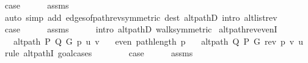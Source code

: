 \begin{isabellebody}
\ {\isacharquery}{\kern0pt}case\isanewline
\ \ \ \ \isamarkupfalse%
\ assms\isanewline
\ \ \ \ \isamarkupfalse%
\ {\isacharparenleft}{\kern0pt}auto\ simp\ add{\isacharcolon}{\kern0pt}\ edges{\isacharunderscore}{\kern0pt}of{\isacharunderscore}{\kern0pt}path{\isacharunderscore}{\kern0pt}rev{\isacharbrackleft}{\kern0pt}symmetric{\isacharbrackright}{\kern0pt}\ dest{\isacharcolon}{\kern0pt}\ alt{\isacharunderscore}{\kern0pt}pathD{\isacharparenleft}{\kern0pt}{}{\isacharparenright}{\kern0pt}\ intro{\isacharcolon}{\kern0pt}\ alt{\isacharunderscore}{\kern0pt}list{\isacharunderscore}{\kern0pt}rev{\isacharparenright}{\kern0pt}\isanewline
{}\isamarkupfalse%
\isanewline
\ \ \isamarkupfalse%
\ {}\isanewline
\ \ \isamarkupfalse%
\ {\isacharquery}{\kern0pt}case\isanewline
\ \ \ \ \isamarkupfalse%
\ assms{\isacharparenleft}{\kern0pt}{}{\isacharparenright}{\kern0pt}\isanewline
\ \ \ \ \isamarkupfalse%
\ {\isacharparenleft}{\kern0pt}intro\ alt{\isacharunderscore}{\kern0pt}pathD{\isacharparenleft}{\kern0pt}{}{\isacharparenright}{\kern0pt}\ walk{\isacharunderscore}{\kern0pt}symmetric{\isacharparenright}{\kern0pt}\isanewline
{}\isamarkupfalse%
%
\endisatagproof
{\isafoldproof}%
%
\isadelimproof
\isanewline
%
\endisadelimproof
\isanewline
{}\isamarkupfalse%
\ alt{\isacharunderscore}{\kern0pt}path{\isacharunderscore}{\kern0pt}rev{\isacharunderscore}{\kern0pt}evenI{\isacharcolon}{\kern0pt}\isanewline
\ \ \ {\isachardoublequoteopen}alt{\isacharunderscore}{\kern0pt}path\ P\ Q\ G\ p\ u\ v{\isachardoublequoteclose}\isanewline
\ \ \ {\isachardoublequoteopen}even\ {\isacharparenleft}{\kern0pt}path{\isacharunderscore}{\kern0pt}length\ p{\isacharparenright}{\kern0pt}{\isachardoublequoteclose}\isanewline
\ \ \ {\isachardoublequoteopen}alt{\isacharunderscore}{\kern0pt}path\ Q\ P\ G\ {\isacharparenleft}{\kern0pt}rev\ p{\isacharparenright}{\kern0pt}\ v\ u{\isachardoublequoteclose}\isanewline
%
\isadelimproof
%
\endisadelimproof
%
\isatagproof
{}\isamarkupfalse%
\ {\isacharparenleft}{\kern0pt}rule\ alt{\isacharunderscore}{\kern0pt}pathI{\isacharcomma}{\kern0pt}\ goal{\isacharunderscore}{\kern0pt}cases{\isacharparenright}{\kern0pt}\isanewline
\ \ \isamarkupfalse%
\ {}\isanewline
\ \ \isamarkupfalse%
\ {\isacharquery}{\kern0pt}case\isanewline
\ \ \ \ \isamarkupfalse%
\ assms\isanewline

\end{isabellebody}
